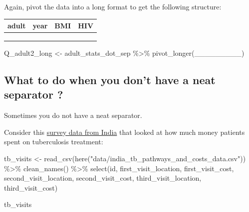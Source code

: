 \documentclass[
  letterpaper,
  DIV=11,
  numbers=noendperiod]{scrreprt}
\newenvironment{Shaded}{\begin{snugshade}}{\end{snugshade}}
\newcommand{\FunctionTok}[1]{\textcolor[rgb]{0.28,0.35,0.67}{#1}}
\newcommand{\NormalTok}[1]{\textcolor[rgb]{0.00,0.23,0.31}{#1}}
\newcommand{\OtherTok}[1]{\textcolor[rgb]{0.00,0.23,0.31}{#1}}
\newcommand{\SpecialCharTok}[1]{\textcolor[rgb]{0.37,0.37,0.37}{#1}}
\newcommand{\StringTok}[1]{\textcolor[rgb]{0.13,0.47,0.30}{#1}}
\begin{document}
\begin{tcolorbox}
Again, pivot the data into a long format to get the following structure:

\begin{longtable}[]{@{}llll@{}}
\toprule\noalign{}
adult & year & BMI & HIV \\
\midrule\noalign{}
\endhead
\bottomrule\noalign{}
\endlastfoot
& & & \\
& & & \\
& & & \\
\end{longtable}

\begin{Shaded}
\begin{Highlighting}[]
\NormalTok{Q\_adult2\_long }\OtherTok{\textless{}{-}}
\NormalTok{  adult\_stats\_dot\_sep }\SpecialCharTok{\%\textgreater{}\%}
  \FunctionTok{pivot\_longer}\NormalTok{(\_\_\_\_\_\_\_\_\_)}
\end{Highlighting}
\end{Shaded}

\end{tcolorbox}

\hypertarget{what-to-do-when-you-dont-have-a-neat-separator}{%
\subsection{What to do when you don't have a neat separator
?}\label{what-to-do-when-you-dont-have-a-neat-separator}}

Sometimes you do not have a neat separator.

Consider this \href{https://zenodo.org/record/5014153}{survey data from
India} that looked at how much money patients spent on tuberculosis
treatment:

\begin{Shaded}
\begin{Highlighting}[]
\NormalTok{tb\_visits }\OtherTok{\textless{}{-}} \FunctionTok{read\_csv}\NormalTok{(}\FunctionTok{here}\NormalTok{(}\StringTok{"data/india\_tb\_pathways\_and\_costs\_data.csv"}\NormalTok{)) }\SpecialCharTok{\%\textgreater{}\%} 
  \FunctionTok{clean\_names}\NormalTok{() }\SpecialCharTok{\%\textgreater{}\%} 
  \FunctionTok{select}\NormalTok{(id, first\_visit\_location, first\_visit\_cost, second\_visit\_location, second\_visit\_cost, third\_visit\_location, third\_visit\_cost)}

\NormalTok{tb\_visits}
\end{Highlighting}
\end{Shaded}
\end{document}
